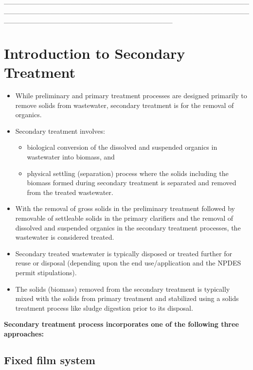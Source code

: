 _________________________________________________________________________________________________________________________________%

\chapter{Introduction to Secondary Treatment}
\begin{itemize}
\item While preliminary and primary treatment processes are designed primarily to remove solids from wastewater, secondary treatment is for the removal of organics.
\item Secondary treatment involves:
\begin{itemize}
\item biological conversion of the dissolved and suspended organics in wastewater into biomass, and
\item physical settling (separation) process where the solids including the biomass formed during secondary treatment is separated and removed from the treated wastewater.
\end{itemize}

\item With the removal of gross solids in the preliminary treatment followed by removable of settleable solids in the primary clarifiers and the removal of dissolved and suspended organics in the secondary treatment processes, the wastewater is considered treated.
\item Secondary treated wastewater is typically disposed or treated further for reuse or disposal (depending upon the end use/application and the NPDES permit stipulations).
\item The solids (biomass) removed from the secondary treatment is typically mixed with the solids from primary treatment and stabilized using a solids treatment process like sludge digestion prior to its disposal.
\end{itemize}
\vspace{1cm}

\textbf{Secondary treatment process incorporates one of the following three approaches:}


\section{Fixed film system}	

